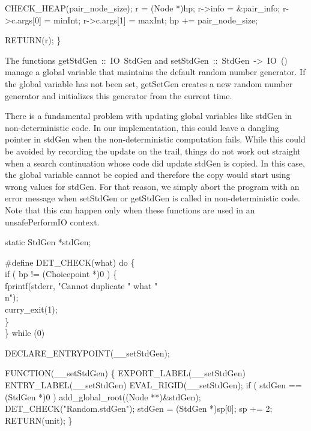     CHECK_HEAP(pair_node_size);
    r            = (Node *)hp;
    r->info      = &pair_info;
    r->c.args[0] = minInt;
    r->c.args[1] = maxInt;
    hp          += pair_node_size;

    RETURN(r);
\}

\nwendcode{}\nwdocspar
The functions {\Tt{}getStdGen\ ::\ IO\ StdGen\nwendquote} and {\Tt{}setStdGen\ ::\ StdGen\ ->\ IO\ ()\nwendquote}
manage a global variable that maintains the default random number
generator. If the global variable has not been set, {\Tt{}getSetGen\nwendquote}
creates a new random number generator and initializes this generator
from the current time.

There is a fundamental problem with updating global variables like
{\Tt{}stdGen\nwendquote} in non-deterministic code. In our implementation, this
could leave a dangling pointer in {\Tt{}stdGen\nwendquote} when the
non-deterministic computation fails. While this could be avoided by
recording the update on the trail, things do not work out straight
when a search continuation whose code did update {\Tt{}stdGen\nwendquote} is copied.
In this case, the global variable cannot be copied and therefore the
copy would start using wrong values for {\Tt{}stdGen\nwendquote}. For that reason,
we simply abort the program with an error message when {\Tt{}setStdGen\nwendquote}
or {\Tt{}getStdGen\nwendquote} is called in non-deterministic code. Note that this
can happen only when these functions are used in an
{\Tt{}unsafePerformIO\nwendquote} context.

\nwenddocs{}\plusendmoddef\nwstartdeflinemarkup{}\nwenddeflinemarkup
static StdGen *stdGen;

#define DET_CHECK(what) do \{ \\
    if ( bp != (Choicepoint *)0 ) \{ \\
        fprintf(stderr, "Cannot duplicate " what "\\n"); \\
        curry_exit(1); \\
    \} \\
\} while (0)

DECLARE_ENTRYPOINT(__setStdGen);

FUNCTION(__setStdGen)
\{
    EXPORT_LABEL(__setStdGen)
 ENTRY_LABEL(__setStdGen)
    EVAL_RIGID(__setStdGen);
    if ( stdGen == (StdGen *)0 )
        add_global_root((Node **)&stdGen);
    DET_CHECK("Random.stdGen");
    stdGen = (StdGen *)sp[0];
    sp    += 2;
    RETURN(unit);
\}

